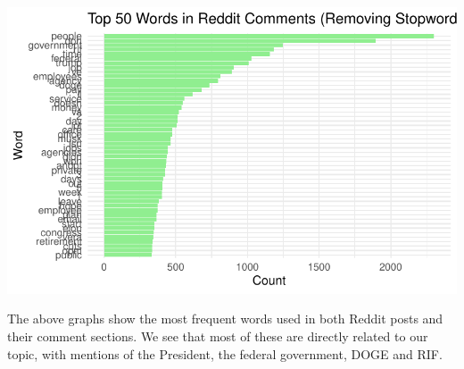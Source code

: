\documentclass[
  letterpaper,
  DIV=11,
  numbers=noendperiod]{scrartcl}
\begin{document}
\includegraphics{Reddit_eda_files/figure-pdf/unnamed-chunk-7-2.pdf}

The above graphs show the most frequent words used in both Reddit posts
and their comment sections. We see that most of these are directly
related to our topic, with mentions of the President, the federal
government, DOGE and RIF.
\end{document}
